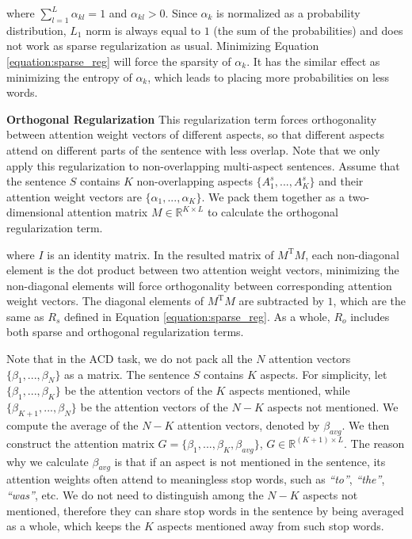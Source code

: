 \documentclass[11pt,a4paper]{article}
\begin{document}
where $\sum\limits_{l=1}^L{\alpha_{kl}}=1$ and $\alpha_{kl}>0$. Since $\alpha_k$ is normalized as a probability distribution, $L_1$ norm is always equal to $1$ (the sum of the probabilities) and does not work as sparse regularization as usual. Minimizing Equation \ref{equation:sparse_reg} will force the sparsity of $\alpha_k$. It has the similar effect as minimizing the entropy of $\alpha_k$, which leads to placing more probabilities on less words.

{\bf Orthogonal Regularization} This regularization term forces orthogonality between attention weight vectors of different aspects, so that different aspects attend on different parts of the sentence with less overlap. Note that we only apply this regularization to non-overlapping multi-aspect sentences. Assume that the sentence $S$ contains $K$ non-overlapping aspects $\{A_1^s,...,A_K^s\}$ and their attention weight vectors are $\{\alpha_1,...,\alpha_K\}$. We pack them together as a two-dimensional attention matrix $M\in\mathbb{R}^{{K}\times{L}}$ to calculate the orthogonal regularization term.

where $I$ is an identity matrix. In the resulted matrix of ${M^{\mathrm{T}}M}$, each non-diagonal element is the dot product between two attention weight vectors, minimizing the non-diagonal elements will force orthogonality between corresponding attention weight vectors. The diagonal elements of ${M^{\mathrm{T}}M}$ are subtracted by $1$, which are the same as $R_s$ defined in Equation \ref{equation:sparse_reg}. As a whole, $R_o$ includes both sparse and orthogonal regularization terms. 

Note that in the ACD task, we do not pack all the $N$ attention vectors $\{\beta_1, ..., \beta_N\}$ as a matrix. The sentence $S$ contains $K$ aspects. For simplicity, let $\{\beta_1, ..., \beta_K\}$ be the attention vectors of the $K$ aspects mentioned, while $\{\beta_{K+1}, ..., \beta_N\}$ be the attention vectors of the $N-K$ aspects not mentioned. We compute the average of the $N-K$ attention vectors, denoted by $\beta_{avg}$. We then construct the attention matrix $G=\{\beta_{1}, ..., \beta_{K},\beta_{avg}\}$, $G\in\mathbb{R}^{{(K+1)}\times{L}}$. The reason why we calculate $\beta_{avg}$ is that if an aspect is not mentioned in the sentence, its attention weights often attend to meaningless stop words, such as \emph{``to''}, \emph{``the''}, \emph{``was''}, etc. We do not need to distinguish among the $N-K$ aspects not mentioned, therefore they can share stop words in the sentence by being averaged as a whole, which keeps the $K$ aspects mentioned away from such stop words. 
\end{document}
